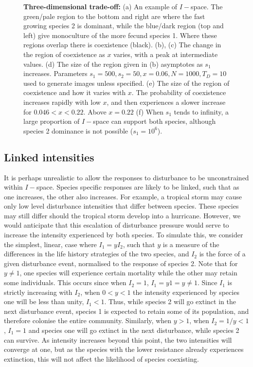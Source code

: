 \begin{figure}[htbp]
\begin{tabular}{rrrr}
\end{tabular}
\caption[Consequences of a three-dimensional trade-off]{\textbf{Three-dimensional trade-off:} (a) An example of $I-$space. The green/pale region to the bottom and right are where the fast growing species 2 is dominant, while the blue/dark region (top and left) give monoculture of the more fecund species 1. Where these regions overlap there is coexistence (black). (b),  (c) The change in the region of coexistence as $x$ varies, with a peak at intermediate values. (d) The size of the region given in (b) asymptotes as $s_1$ increases. Parameters $s_1=500,s_2=50,x=0.06,N=1000,T_D=10$ used to generate images unless specified. (e) The size of the region of coexistence and how it varies with $x$. The probability of coexistence increases rapidly with low $x$, and then experiences a slower increase for $0.046<x<0.22$. Above $x=0.22$ (f) When $s_1$ tends to infinity, a large proportion of $I-$space can support both species, although species 2 dominance is not possible ($s_1=10^6$).}
\label{full}
\end{figure}

\subsection{Linked intensities}
It is perhaps unrealistic to allow the responses to disturbance to  be unconstrained within $I-$space. Species specific responses are likely to be linked, such that as one increases, the other also increases. For example, a tropical storm may cause only low level disturbance intensities that differ between species. These species may still differ should the tropical storm develop into a hurricane. However, we would anticipate that this escalation of disturbance pressure would serve to increase the intensity experienced by both species. To simulate this, we consider the simplest, linear, case where $I_1=yI_2$, such that $y$ is a measure of the differences in the life history strategies of the two species, and $I_2$ is the force of a given disturbance event, normalised to the response of species 2. Note that for $y\neq 1$, one species will experience certain mortality while the other may retain some individuals. This occurs since when $I_2=1$, $I_1=y1=y\neq1$. Since $I_1$ is strictly increasing with $I_2$, when $0<y<1$ the intensity experienced by species one will be less than unity, $I_1<1$. Thus, while species 2 will go extinct in the next disturbance event, species 1 is expected to retain some of its population, and therefore colonise the entire community. Similarly, when $y>1$, when $I_2=1/y <1$, $I_1=1$ and species one will go extinct in the next disturbance, while species 2 can survive. As intensity increases beyond this point, the two intensities will converge at one, but as the species with the lower resistance already experiences extinction, this will not affect the likelihood of species coexisting.


